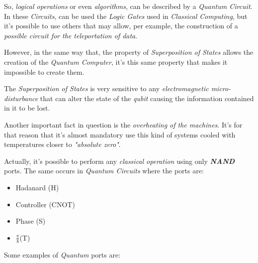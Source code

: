 \documentclass[conference]{IEEEtran}
\begin{document}
\vspace{4pt}

So, \textit{logical operations} or even \textit{algorithms}, can be described by a \textit{Quantum Circuit}. In these \textit{Circuits}, can be used the \textit{Logic Gates} used in \textit{Classical Computing}, but it's possible to use others that may allow, per example, the construction of a \textit{possible circuit for the teleportation of data}.

\vspace{4pt}

However, in the same way that, the property of \textit{Superposition of States} allows the creation of the \textit{Quantum Computer}, it's this same property that makes it impossible to create them.

\vspace{4pt}

The \textit{Superposition of States} is very sensitive to any \textit{electromagnetic micro-disturbance} that can alter the state of the \textit{qubit} causing the information contained in it to be lost.

\vspace{4pt}

Another important fact in question is the \textit{overheating of the machines}. It's for that reason that it's almost mandatory use this kind of systems cooled with temperatures closer to \textit{"absolute zero"}.

\newpage

Actually, it's possible to perform any \textit{classical operation} using only \textit{\textbf{NAND}} ports. The same occurs in \textit{Quantum Circuits} where the ports are:

\begin{itemize}
    \item Hadanard (H)
    \item Controller (CNOT)
    \item Phase (S)
    \item $\frac{\pi}{8}$(T)
\end{itemize}

\vspace{4pt}

Some examples of \textit{Quantum} ports are:
\end{document}
